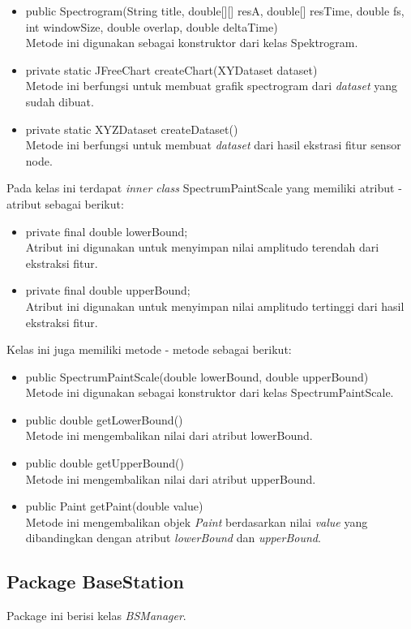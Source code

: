 \begin{itemize}
	\item public Spectrogram(String title, double[][] resA, double[] resTime, double fs, int windowSize, double overlap,
			double deltaTime) \\
		Metode ini digunakan sebagai konstruktor dari kelas Spektrogram.
	\item private static JFreeChart createChart(XYDataset dataset) \\
		Metode ini berfungsi untuk membuat grafik spectrogram dari {\it dataset} yang sudah dibuat.
	\item private static XYZDataset createDataset()\\
		Metode ini berfungsi untuk membuat {\it dataset} dari hasil ekstrasi fitur sensor node.
\end{itemize}
Pada kelas ini terdapat {\it inner class} SpectrumPaintScale yang memiliki atribut - atribut sebagai berikut:
\begin{itemize}
	\item private final double lowerBound;\\
		Atribut ini digunakan untuk menyimpan nilai amplitudo terendah dari ekstraksi fitur.
	\item private final double upperBound;\\
		Atribut ini digunakan untuk menyimpan nilai amplitudo tertinggi dari hasil ekstraksi fitur.
\end{itemize}
Kelas ini juga memiliki metode - metode sebagai berikut: 
\begin{itemize}
	\item public SpectrumPaintScale(double lowerBound, double upperBound)\\
		Metode ini digunakan sebagai konstruktor dari kelas SpectrumPaintScale.
	\item public double getLowerBound()\\
		Metode ini mengembalikan nilai dari atribut lowerBound.
	\item public double getUpperBound() \\
		Metode ini mengembalikan nilai dari atribut upperBound.
	\item public Paint getPaint(double value)\\
		Metode ini mengembalikan objek {\it Paint} berdasarkan nilai {\it value} yang dibandingkan dengan atribut {\it lowerBound} dan {\it upperBound}.
\end{itemize}

\subsection{Package BaseStation}
Package ini berisi kelas {\it BSManager}.

